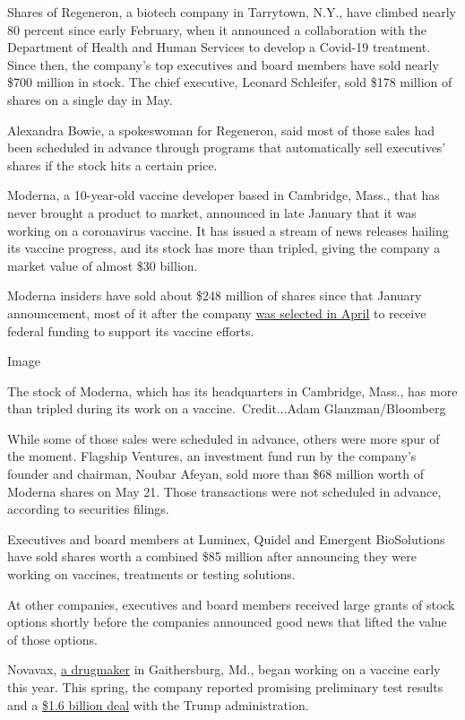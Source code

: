 Shares of Regeneron, a biotech company in Tarrytown, N.Y., have climbed
nearly 80 percent since early February, when it announced a
collaboration with the Department of Health and Human Services to
develop a Covid-19 treatment. Since then, the company's top executives
and board members have sold nearly \$700 million in stock. The chief
executive, Leonard Schleifer, sold \$178 million of shares on a single
day in May.

Alexandra Bowie, a spokeswoman for Regeneron, said most of those sales
had been scheduled in advance through programs that automatically sell
executives' shares if the stock hits a certain price.

Moderna, a 10-year-old vaccine developer based in Cambridge, Mass., that
has never brought a product to market, announced in late January that it
was working on a coronavirus vaccine. It has issued a stream of news
releases hailing its vaccine progress, and its stock has more than
tripled, giving the company a market value of almost \$30 billion.

Moderna insiders have sold about \$248 million of shares since that
January announcement, most of it after the company
\href{https://investors.modernatx.com/news-releases/news-release-details/moderna-announces-award-us-government-agency-barda-483-million}{was
selected in April} to receive federal funding to support its vaccine
efforts.

Image

The stock of Moderna, which has its headquarters in Cambridge, Mass.,
has more than tripled during its work on a vaccine.~Credit...Adam
Glanzman/Bloomberg

While some of those sales were scheduled in advance, others were more
spur of the moment. Flagship Ventures, an investment fund run by the
company's founder and chairman, Noubar Afeyan, sold more than \$68
million worth of Moderna shares on May 21. Those transactions were not
scheduled in advance, according to securities filings.

Executives and board members at Luminex, Quidel and Emergent
BioSolutions have sold shares worth a combined \$85 million after
announcing they were working on vaccines, treatments or testing
solutions.

At other companies, executives and board members received large grants
of stock options shortly before the companies announced good news that
lifted the value of those options.

Novavax,
\href{https://www.nytimes3xbfgragh.onion/2020/07/16/health/coronavirus-vaccine-novavax.html}{a
drugmaker} in Gaithersburg, Md., began working on a vaccine early this
year. This spring, the company reported promising preliminary test
results and a
\href{https://www.nytimes3xbfgragh.onion/2020/07/07/health/novavax-coronavirus-vaccine-warp-speed.html}{\$1.6
billion deal} with the Trump administration.

